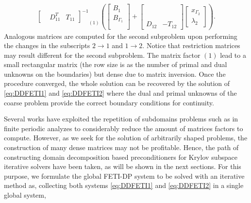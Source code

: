 \begin{multline}
{\begin{bmatrix}
 & D_{11}^T  & T_{11}
\end{bmatrix}^{-1}
}_{(1)}
\left(
\begin{bmatrix}
B_{1}\\
B_{\Gamma_1}\\
\phantom{x}
\end{bmatrix}
+
\begin{bmatrix}
\phantom{A} & \phantom{A}\\
\phantom{A} & \phantom{A}\\
D_{12}  & -T_{12}
\end{bmatrix}
\begin{bmatrix}
x_{\Gamma_2}\\
\lambda_{2}
\end{bmatrix}
\right).
\end{multline}
\noindent Analogous matrices are computed for the second subproblem upon performing the changes in the subscripts $2 \rightarrow 1$ and $1 \rightarrow 2$. Notice that restriction matrices may result different for the second subproblem. The matrix factor $(1)$ lead to a small rectangular matrix (the row size is as the number of primal and dual unknowns on the boundaries) but dense due to matrix inversion. Once the procedure converged, the whole solution can be recovered by the solution of \eqref{eq:DDFETI1} and \eqref{eq:DDFETI2} where the dual and primal unknowns of the coarse problem provide the correct boundary conditions for continuity.

Several works \cite{Vouvakis2004,lee2005non,Vouvakis2006, li2006vector} have exploited the repetition of subdomains problems such as in finite periodic analyzes to considerably reduce the amount of matrices factors to compute. However, as we seek for the solution of arbitrarily shaped problems, the construction of many dense matrices may not be profitable. Hence, the path of constructing domain decomposition based preconditioners for Krylov subspace iterative solvers have been taken, as will be shown in the next sections. For this purpose, we formulate the global FETI-DP system to be solved with an iterative method as, collecting both systems \eqref{eq:DDFETI1} and \eqref{eq:DDFETI2} in a single global system,

